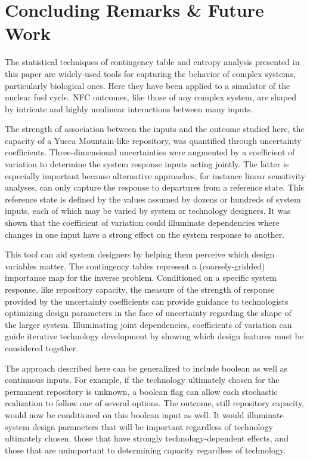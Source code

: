 \section{Concluding Remarks \& Future Work}
\label{cts_sec:conclusion}

The statistical techniques of contingency table and entropy analysis presented 
in this paper are widely-used tools for capturing the behavior of complex systems, 
particularly biological ones.  Here they have been applied to a simulator of the 
nuclear fuel cycle.  NFC outcomes, like those of any complex system, are shaped 
by intricate and highly nonlinear interactions between many inputs.

The strength of association between the inputs and the outcome studied here, the 
capacity of a Yucca Mountain-like repository, was quantified through uncertainty 
coefficients.  Three-dimensional uncertainties were augmented by a coefficient of 
variation to determine the system response inputs acting jointly.  The latter is 
especially important because alternative approaches, for instance linear sensitivity 
analyses, can only capture the response to departures from a reference state.  This 
reference state is defined by the values assumed by dozens or hundreds of system 
inputs, each of which may be varied by system or technology designers.  It was 
shown that the coefficient of variation could illuminate dependencies where changes 
in one input have a strong effect on the system response to another.  

This tool can aid system designers by helping them perceive which design variables 
matter.  The contingency tables represent a (coarsely-gridded) importance map for 
the inverse problem.  Conditioned on a specific system response, like repository 
capacity, the measure of the strength of response provided by the uncertainty coefficients 
can provide guidance to technologists optimizing design parameters in the face of uncertainty 
regarding the shape of the larger system.  Illuminating joint dependencies, coefficients of 
variation can guide iterative technology development by showing which design features must 
be considered together.

The approach described here can be generalized to include boolean as well as continuous inputs.  
For example, if the technology ultimately chosen for the permanent repository is unknown, 
a boolean flag can allow each stochastic realization to follow one of several options.  
The outcome, still repository capacity, would now be conditioned on this boolean input as well.  
It would illuminate system design parameters that will be important regardless of technology 
ultimately chosen, those that have strongly technology-dependent effects, and those that are 
unimportant to determining capacity regardless of technology.  

